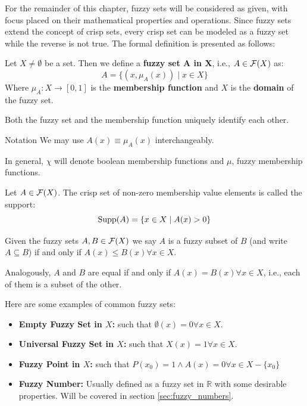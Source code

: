 For the remainder of this chapter, fuzzy sets will be considered as given, with focus placed on their mathematical properties and operations. Since fuzzy sets extend the concept of crisp sets, every crisp set can be modeled as a fuzzy set while the reverse is not true. The formal definition is presented as follows:

\begin{definition}
    Let $X\neq\emptyset$ be a set. Then we define a \textbf{fuzzy set A in X}, i.e., $A \in \mathcal{F}(X)$ as:
    \[A=\{(x,\mu_A(x))\mid x\in X\}\]
    Where $\mu_A:X\longrightarrow [0,1]$ is the \textbf{membership function} and $X$ is the \textbf{domain} of the fuzzy set.
\end{definition}

\begin{remark}
     Both the fuzzy set and the membership function uniquely identify each other.
\end{remark}

\begin{notation}{Notation}
    We may use \( A(x) \equiv \mu_A(x) \) interchangeably.

    In general, $\chi$ will denote boolean membership functions and $\mu$, fuzzy membership functions.
\end{notation}



\begin{definition}[Support]
    Let $A \in \mathcal{F}(X)$. The crisp set of non-zero membership value elements is called the support:
    \[\textnormal{Supp}(A)=\{x\in X \mid A(x)>0\}\]
\end{definition}

\begin{definition}
    Given the fuzzy sets $A, B \in \mathcal{F}(X)$ we say $A$ is a fuzzy subset of $B$ (and write $A \subseteq B$) if and only if $A(x)
    \leq B(x) \forall x \in X$.

    Analogously, $A$ and $B$ are equal if and only if $A(x)=B(x) \forall x \in X$, i.e., each of them is a subset of the other.
\end{definition}

\begin{example}
    Here are some examples of common fuzzy sets:
    \begin{itemize}
        \item \textbf{Empty Fuzzy Set in $X$:} such that $\emptyset(x)=0 \forall x \in X$.
        \item \textbf{Universal Fuzzy Set in $X$:} such that $X(x)=1  \forall x \in X$.
        \item \textbf{Fuzzy Point in $X$:} such that $P(x_0)=1 \land A(x)=0 \forall x \in X-\{x_0\}$
        \item \textbf{Fuzzy Number:} Usually defined as a fuzzy set in $\mathbb{R}$ with some desirable properties. Will be covered in section \ref{sec:fuzzy_numbers}.
    \end{itemize}
\end{example}
